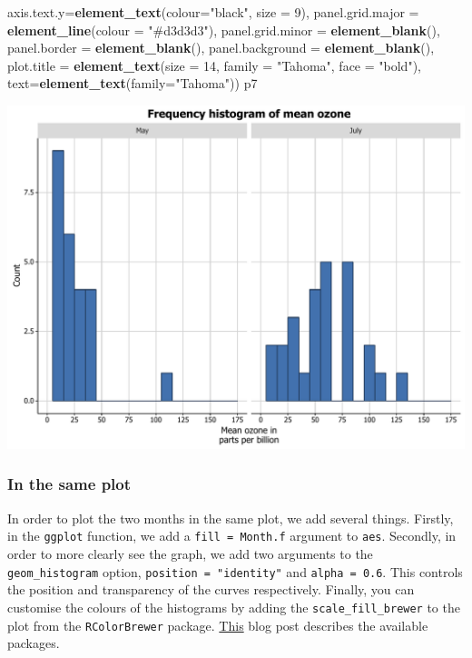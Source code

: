 \documentclass[]{article}
\newenvironment{Shaded}{\begin{snugshade}}{\end{snugshade}}
\newcommand{\KeywordTok}[1]{\textcolor[rgb]{0.13,0.29,0.53}{\textbf{{#1}}}}
\newcommand{\DataTypeTok}[1]{\textcolor[rgb]{0.13,0.29,0.53}{{#1}}}
\newcommand{\DecValTok}[1]{\textcolor[rgb]{0.00,0.00,0.81}{{#1}}}
\newcommand{\StringTok}[1]{\textcolor[rgb]{0.31,0.60,0.02}{{#1}}}
\newcommand{\NormalTok}[1]{{#1}}
\begin{document}
\begin{Shaded}
\begin{Highlighting}[]
            \DataTypeTok{axis.text.y=}\KeywordTok{element_text}\NormalTok{(}\DataTypeTok{colour=}\StringTok{"black"}\NormalTok{, }\DataTypeTok{size =} \DecValTok{9}\NormalTok{),}
            \DataTypeTok{panel.grid.major =} \KeywordTok{element_line}\NormalTok{(}\DataTypeTok{colour =} \StringTok{"#d3d3d3"}\NormalTok{), }
            \DataTypeTok{panel.grid.minor =} \KeywordTok{element_blank}\NormalTok{(), }
            \DataTypeTok{panel.border =} \KeywordTok{element_blank}\NormalTok{(), }\DataTypeTok{panel.background =} \KeywordTok{element_blank}\NormalTok{(),}
            \DataTypeTok{plot.title =} \KeywordTok{element_text}\NormalTok{(}\DataTypeTok{size =} \DecValTok{14}\NormalTok{, }\DataTypeTok{family =} \StringTok{"Tahoma"}\NormalTok{, }\DataTypeTok{face =} \StringTok{"bold"}\NormalTok{),}
            \DataTypeTok{text=}\KeywordTok{element_text}\NormalTok{(}\DataTypeTok{family=}\StringTok{"Tahoma"}\NormalTok{))}
\NormalTok{p7}
\end{Highlighting}
\end{Shaded}

\begin{center}\includegraphics{0_all_posts_pdf/histogram_18-1} \end{center}

\subsubsection{In the same plot}\label{in-the-same-plot}

In order to plot the two months in the same plot, we add several things.
Firstly, in the \texttt{ggplot} function, we add a
\texttt{fill\ =\ Month.f} argument to \texttt{aes}. Secondly, in order
to more clearly see the graph, we add two arguments to the
\texttt{geom\_histogram} option, \texttt{position\ =\ "identity"} and
\texttt{alpha\ =\ 0.6}. This controls the position and transparency of
the curves respectively. Finally, you can customise the colours of the
histograms by adding the \texttt{scale\_fill\_brewer} to the plot from
the \texttt{RColorBrewer} package.
\href{http://moderndata.plot.ly/create-colorful-graphs-in-r-with-rcolorbrewer-and-plotly/}{This}
blog post describes the available packages.
\end{document}
